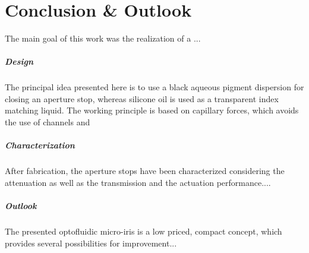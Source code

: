 %
\chapter{Conclusion \& Outlook}

The main goal of this work was the realization of a ...

\paragraph{Design}
The principal idea presented here is to use a black aqueous pigment dispersion for closing an aperture stop, whereas silicone oil is used as a transparent index matching liquid. The working principle is based on capillary forces, which avoids the use of channels and 

\paragraph{Characterization}
After fabrication, the aperture stops have been characterized considering the attenuation as well as the transmission and the actuation performance....


\paragraph{Outlook}
The presented optofluidic micro-iris is a low priced, compact concept, which provides several possibilities for improvement...


